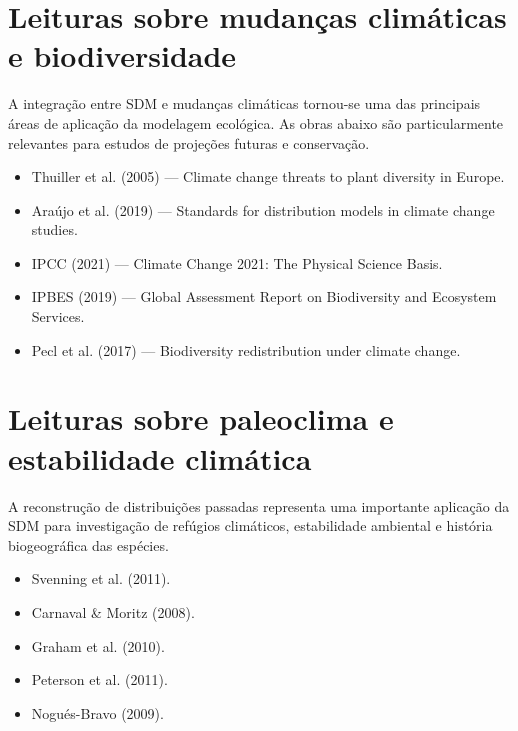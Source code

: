 \documentclass{ueap-sdm}
\begin{document}
\section{Leituras sobre mudanças climáticas e biodiversidade}

A integração entre SDM e mudanças climáticas tornou-se uma das principais áreas
de aplicação da modelagem ecológica. As obras abaixo são particularmente
relevantes para estudos de projeções futuras e conservação.

\begin{itemize}
	
	\item Thuiller et al. (2005) --- Climate change threats to plant diversity in Europe.
	
	\item Araújo et al. (2019) --- Standards for distribution models in climate change studies.
	
	\item IPCC (2021) --- Climate Change 2021: The Physical Science Basis.
	
	\item IPBES (2019) --- Global Assessment Report on Biodiversity and Ecosystem Services.
	
	\item Pecl et al. (2017) --- Biodiversity redistribution under climate change.
	
\end{itemize}

\section{Leituras sobre paleoclima e estabilidade climática}

A reconstrução de distribuições passadas representa uma importante aplicação da
SDM para investigação de refúgios climáticos, estabilidade ambiental e
história biogeográfica das espécies.

\begin{itemize}
	
	\item Svenning et al. (2011).
	
	\item Carnaval \& Moritz (2008).
	
	\item Graham et al. (2010).
	
	\item Peterson et al. (2011).
	
	\item Nogués-Bravo (2009).
	
\end{itemize}
\end{document}
